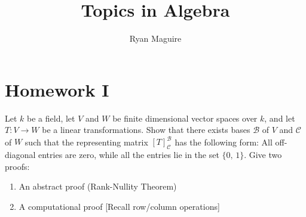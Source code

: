 \documentclass[crop=false,class=article]{standalone}                           %
\begin{document}
    \title{Topics in Algebra}
    \author{Ryan Maguire}
    \date{\vspace{-5ex}}
    \maketitle
    \section{Homework I}
        \begin{problem}
            Let $k$ be a field, let $V$ and $W$ be finite dimensional vector
            spaces over $k$, and let $T:V\rightarrow{W}$ be a linear
            transformations. Show that there exists bases $\mathscr{B}$ of $V$
            and $\mathscr{C}$ of $W$ such that the representing matrix
            $[T]_{\mathscr{C}}^{\mathscr{B}}$ has the following form: All
            off-diagonal entries are zero, while all the entries lie in the set
            $\{0,\,1\}$. Give two proofs:
            \begin{enumerate}
                \item   An abstract proof (Rank-Nullity Theorem)
                \item   A computational proof [Recall row/column operations]
            \end{enumerate}
        \end{problem}
\end{document}
